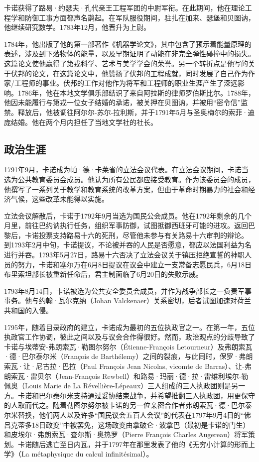 卡诺获得了路易·约瑟夫·孔代亲王工程军团的中尉军衔。在此期间，他在理论工程学和防御工事方面都声名鹊起。在军队服役期间，驻扎在加来、瑟堡和贝图讷，他继续研究数学。1783年12月，他晋升为上尉。

1784年，他出版了他的第一部著作《机器学论文》，其中包含了预示着能量原理的表述，涉及到下落物体的能量，以及早期证明了动能在非完全弹性碰撞中的损失。这篇论文使他赢得了第戎科学、艺术与美学学会的荣誉。另一个转折点是他写的关于伏邦的论文，在这篇论文中，他赞扬了伏邦的工程成就，同时发展了自己作为作家/工程师的事业。伏邦的工作对他作为将军和工程师的职业生涯产生了深远影响。1786年，他在本地文学俱乐部结识了来自阿拉斯的律师罗伯斯比尔。1788年，他因未能履行与第戎一位女子结婚的承诺，被关押在贝图讷，并被用“密令信”监禁。释放后，他被调往阿尔尔-苏尔-拉利斯，并于1791年5月与圣奥梅尔的索菲·迪庞结婚。他在两个月内担任了当地文学社的社长。
\subsection{政治生涯}  
1791年9月，卡诺成为帕·德·卡莱省的立法会议代表。在立法会议期间，卡诺当选为公共教育委员会成员。他认为所有公民都应接受教育。作为该委员会的成员，他撰写了一系列关于教学和教育系统的改革方案，但由于革命时期暴力的社会和经济气候，这些改革未能得以实施。

立法会议解散后，卡诺于1792年9月当选为国民公会成员。他在1792年剩余的几个月里，前往巴约讷执行任务，组织军事防御，试图抵御西班牙可能的进攻。返回巴黎后，卡诺投票支持路易十六的死刑，尽管他未参与有关路易十六审判的辩论。  
到1793年2月中旬，卡诺提议，不论被并吞的人民是否愿意，都应以法国利益为名进行并吞。1793年5月27日，路易十六否决了立法会议关于镇压拒绝宣誓的神职人员的努力，卡诺和塞尔万在6月8日提议在议会中建立一支常备志愿民兵，6月18日布里索坦部长被重新任命后，君主制面临了6月20日的失败示威。

1793年8月14日，卡诺被选为公共安全委员会成员，并作为战争部长之一负责军事事务。他与约翰·瓦尔克纳（Johan Valckenaer）关系密切，后者试图加速对荷兰共和国的入侵。

1795年，随着目录政府的建立，卡诺成为最初的五位执政官之一。在第一年，五位执政官工作协调，彼此之间以及与议会合作得很好。然而，政治观点的分歧导致了卡诺与埃蒂安-弗朗索瓦·勒图尔努尔（Étienne-François Letourneur）及弗朗索瓦·德·巴尔泰尔米（François de Barthélemy）之间的裂痕，与此同时，保罗·弗朗索瓦·让·尼古拉·巴拉（Paul François Jean Nicolas, vicomte de Barras）、让-弗朗索瓦·雷贝尔（Jean-François Rewbell）和路易·玛丽·德·拉·雷维利埃尔-勒佩奥（Louis Marie de La Révellière-Lépeaux）三人组成的三人执政团则是另一方。卡诺和巴尔泰尔米支持通过妥协结束战争，并希望推翻三人执政团，用更保守的人取而代之。随着勒图尔努尔被卡诺的另一位亲密合作者弗朗索瓦·德·巴尔泰尔米替换，他们两人以及许多“国民议会五百人会议”的代表在1797年9月4日的“佛吕克蒂多18日政变”中被罢免，这场政变由拿破仑·波拿巴（最初是卡诺的门生）和皮埃尔·弗朗索瓦·查尔斯·奥热罗（Pierre François Charles Augereau）将军策划。卡诺随后逃亡至日内瓦，并于1797年在那里发表了他的《无穷小计算的形而上学》（La métaphysique du calcul infinitésimal）。
